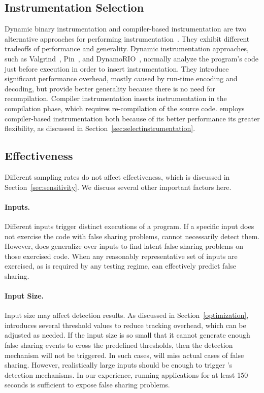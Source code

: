 \label{sec:discussion}

\subsection{Instrumentation Selection}
\label{sec:instrumentationtradeoff}
Dynamic binary instrumentation and compiler-based instrumentation are two alternative approaches for performing instrumentation~\cite{Instrumentation}. They exhibit different tradeoffs of performance and generality. Dynamic instrumentation approaches, such as Valgrind~\cite{Valgrind}, Pin~\cite{Pin}, and DynamoRIO~\cite{DynamoRIO}, normally analyze the program's code just before execution in order to insert instrumentation. They introduce significant performance overhead, mostly caused by run-time encoding and decoding, but provide better generality because there is no need for recompilation. Compiler instrumentation inserts instrumentation in the compilation phase, which requires re-compilation of the source code. 
\Predator{} employs compiler-based instrumentation both because of its better performance its greater flexibility, as discussed in Section~\ref{sec:selectinstrumentation}.

\subsection{Effectiveness}
Different sampling rates do not affect effectiveness, which is discussed in Section~\ref{sec:sensitivity}. We discuss several other important factors here. 

\paragraph{Inputs.} Different inputs trigger distinct executions of a program. If a specific input does not exercise the code with false sharing problems, \Predator{} cannot necessarily detect them. However, \Predator{} does generalize over inputs to find latent false sharing problems on those exercised code. When any reasonably representative set of inputs are exercised, as is required by any testing regime, \Predator{} can effectively predict false sharing.

\paragraph{Input Size.} Input size may affect detection results.  As discussed in Section~\ref{optimization}, \Predator{} introduces several threshold values to reduce tracking overhead, which can be adjusted as needed. If the input size is so small that it cannot generate enough false sharing events to cross the predefined thresholds, then the detection mechanism will not be triggered. In such cases, \Predator{} will miss actual cases of false sharing. However, realistically large inputs should be enough to trigger \Predator{}'s detection mechanisms. In our experience, running applications for at least 150 seconds is sufficient to expose false sharing problems. 

